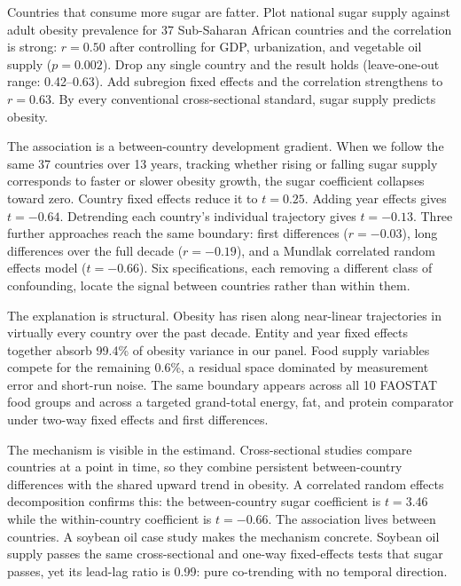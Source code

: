 \documentclass[letterpaper,11pt,leqno]{article}
\begin{document}
Countries that consume more sugar are fatter. Plot national sugar supply against adult obesity prevalence for 37 Sub-Saharan African countries and the correlation is strong: $r = 0.50$ after controlling for GDP, urbanization, and vegetable oil supply ($p = 0.002$). Drop any single country and the result holds (leave-one-out range: 0.42--0.63). Add subregion fixed effects and the correlation strengthens to $r = 0.63$. By every conventional cross-sectional standard, sugar supply predicts obesity.

The association is a between-country development gradient. When we follow the same 37 countries over 13 years, tracking whether rising or falling sugar supply corresponds to faster or slower obesity growth, the sugar coefficient collapses toward zero. Country fixed effects reduce it to $t = 0.25$. Adding year effects gives $t = -0.64$. Detrending each country's individual trajectory gives $t = -0.13$. Three further approaches reach the same boundary: first differences ($r = -0.03$), long differences over the full decade ($r = -0.19$), and a Mundlak correlated random effects model ($t = -0.66$). Six specifications, each removing a different class of confounding, locate the signal between countries rather than within them.

The explanation is structural. Obesity has risen along near-linear trajectories in virtually every country over the past decade. Entity and year fixed effects together absorb 99.4\% of obesity variance in our panel. Food supply variables compete for the remaining 0.6\%, a residual space dominated by measurement error and short-run noise. The same boundary appears across all 10 FAOSTAT food groups and across a targeted grand-total energy, fat, and protein comparator under two-way fixed effects and first differences.

The mechanism is visible in the estimand. Cross-sectional studies compare countries at a point in time, so they combine persistent between-country differences with the shared upward trend in obesity. A correlated random effects decomposition confirms this: the between-country sugar coefficient is $t = 3.46$ while the within-country coefficient is $t = -0.66$. The association lives between countries. A soybean oil case study makes the mechanism concrete. Soybean oil supply passes the same cross-sectional and one-way fixed-effects tests that sugar passes, yet its lead-lag ratio is 0.99: pure co-trending with no temporal direction.
\end{document}
